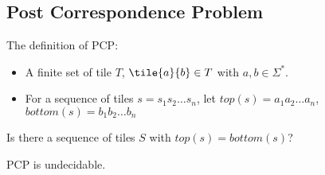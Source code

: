 \subsection{Post Correspondence
Problem}

\begin{definition}
The definition of PCP:

\begin{itemize}
\item
  A finite set of tile $T$,  $\tile{a}{b} \in T$ with $a,b \in \Sigma^*$.
\item
  For a sequence of tiles $s=s_1s_2\dots s_n$, let
  $top(s)=a_1a_2\dots a_n$,
  $bottom(s)=b_1b_2\dots b_n$
\end{itemize}

Is there a sequence of tiles $S$ with $top(s)=bottom(s)$?
\end{definition}

\begin{theorem}
PCP is undecidable.
\end{theorem}

